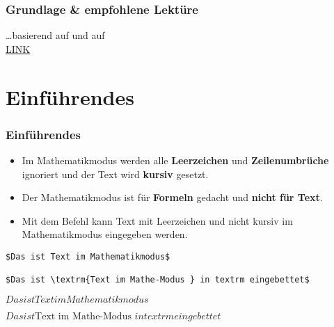 \begin{frame}
\frametitle{Grundlage \& empfohlene Lektüre}

\dots basierend auf \citet{Freitag&MyP15a} und auf \citet{MyP&Kerkhof16a}\\
\ras \href{https://www.researchgate.net/publication/279514740_LATEX-Einfuhrung_fur_Linguisten}{LINK}

\end{frame}


\section{Einführendes}

\begin{frame}[fragile]
\frametitle{Einführendes}


\begin{itemize}
	\item Im Mathematikmodus werden alle \textbf{Leerzeichen} und \textbf{Zeilenumbrüche} ignoriert und der Text wird \textbf{kursiv} gesetzt.
	
	\item Der Mathematikmodus ist für \textbf{Formeln} gedacht und \textbf{nicht für Text}.
	
	\item Mit dem Befehl \textbf{} kann Text mit Leerzeichen und nicht kursiv im Mathematikmodus eingegeben werden. 

\end{itemize}

\pause 
{\small 
\begin{lstlisting}
$Das ist Text im Mathematikmodus$ 

$Das ist \textrm{Text im Mathe-Modus } in textrm eingebettet$
\end{lstlisting}
}

\ea $Das ist Text im Mathematikmodus$ 

\ex $Das ist \textrm{Text im Mathe-Modus } in textrm eingebettet$
\z 

\end{frame}



